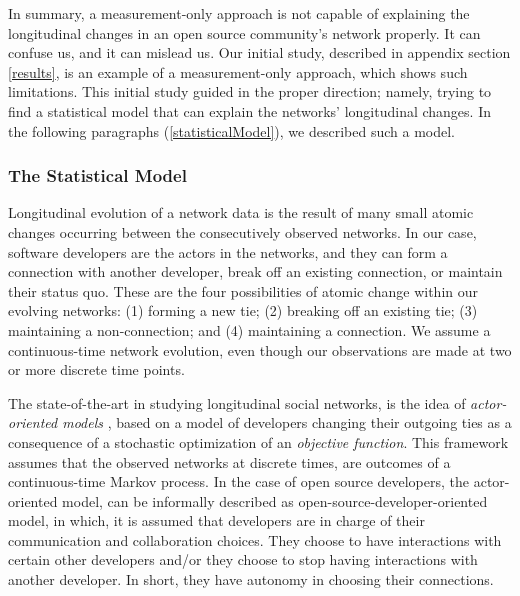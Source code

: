 \documentclass[12pt,letterpaper]{gthesis2}  %
\begin{document}
In summary, a measurement-only approach is not capable of explaining the longitudinal changes in an open source community's network properly. It can confuse us, and it can mislead us. Our initial study, described in appendix section \ref{results}, is an example of a measurement-only approach, which shows such limitations. This initial study guided in the proper direction; namely, trying to find a statistical model that can explain the networks' longitudinal changes. In the following paragraphs (\ref{statisticalModel}), we described such a model.  

%

\subsubsection*{The Statistical Model}
\label{statisticalModel}

Longitudinal evolution of a network data is the result of many small atomic changes occurring between the consecutively observed networks. In our case, software developers are the actors in the networks, and they can form a connection with another developer, break off an existing connection, or maintain their status quo. These are the four possibilities of atomic change within our evolving networks: (1) forming a new tie; (2) breaking off an existing tie; (3) maintaining a non-connection; and (4) maintaining a connection. We assume a continuous-time network evolution, even though our observations are made at two or more discrete time points. 

The state-of-the-art in studying longitudinal social networks, is the idea of \textit{actor-oriented models} \cite{Snijders2010}, based on a model of developers changing their outgoing ties as a consequence of a stochastic optimization of an \textit{objective function}. This framework assumes that the observed networks at discrete times, are outcomes of a continuous-time Markov process. In the case of open source developers, the actor-oriented model, can be informally described as open-source-developer-oriented model, in which, it is assumed that developers are in charge of their communication and collaboration choices. They choose to have interactions with certain other developers and/or they choose to stop having interactions with another developer. In short, they have autonomy in choosing their connections.
\end{document}
